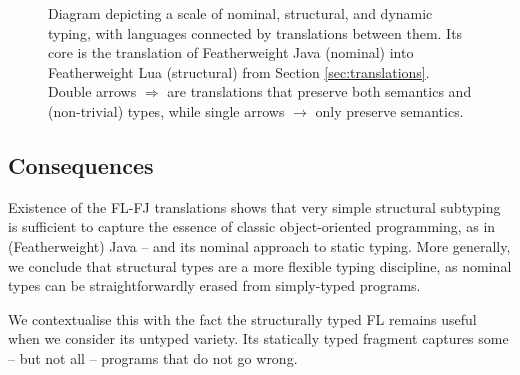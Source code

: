 \begin{figure}[t]
    \centering
    \caption{Diagram depicting a scale of nominal, structural, and dynamic typing, with languages connected by translations between them. Its core is the translation of Featherweight Java (nominal) into Featherweight Lua (structural) from Section \ref{sec:translations}. Double arrows $\Rightarrow$ are translations that preserve both semantics and (non-trivial) types, while single arrows $\to$ only preserve semantics.}
    \label{fig:nominal-structural-dynamic}
\end{figure}

\subsection{Consequences}

Existence of the FL-FJ translations shows that very simple structural subtyping is sufficient to capture the essence of classic object-oriented programming, as in (Featherweight) Java -- and its nominal approach to static typing.
More generally, we conclude that structural types are a more flexible typing discipline, as nominal types can be straightforwardly erased from simply-typed programs.

We contextualise this with the fact the structurally typed FL remains useful when we consider its untyped variety. Its statically typed fragment captures some -- but not all -- programs that do not go wrong.


